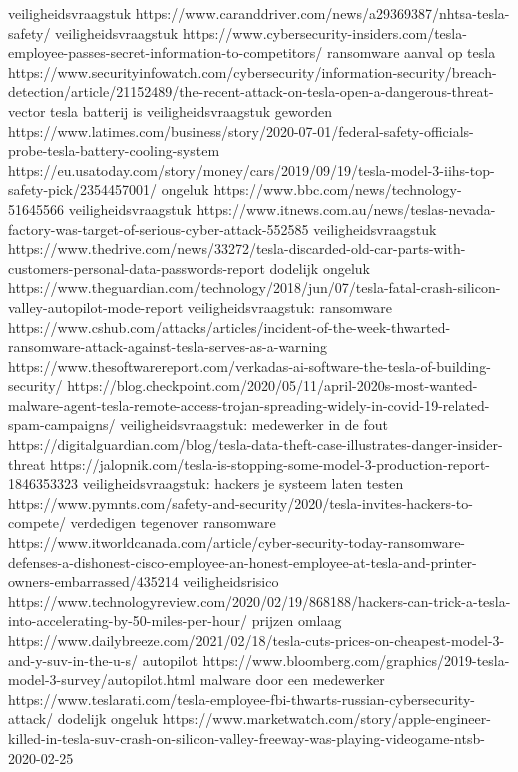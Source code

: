 veiligheidsvraagstuk
https://www.caranddriver.com/news/a29369387/nhtsa-tesla-safety/
veiligheidsvraagstuk
https://www.cybersecurity-insiders.com/tesla-employee-passes-secret-information-to-competitors/
ransomware aanval op tesla
https://www.securityinfowatch.com/cybersecurity/information-security/breach-detection/article/21152489/the-recent-attack-on-tesla-open-a-dangerous-threat-vector
tesla batterij is veiligheidsvraagstuk geworden
https://www.latimes.com/business/story/2020-07-01/federal-safety-officials-probe-tesla-battery-cooling-system
https://eu.usatoday.com/story/money/cars/2019/09/19/tesla-model-3-iihs-top-safety-pick/2354457001/
ongeluk
https://www.bbc.com/news/technology-51645566
veiligheidsvraagstuk
https://www.itnews.com.au/news/teslas-nevada-factory-was-target-of-serious-cyber-attack-552585
veiligheidsvraagstuk
https://www.thedrive.com/news/33272/tesla-discarded-old-car-parts-with-customers-personal-data-passwords-report
dodelijk ongeluk
https://www.theguardian.com/technology/2018/jun/07/tesla-fatal-crash-silicon-valley-autopilot-mode-report
veiligheidsvraagstuk: ransomware
https://www.cshub.com/attacks/articles/incident-of-the-week-thwarted-ransomware-attack-against-tesla-serves-as-a-warning
https://www.thesoftwarereport.com/verkadas-ai-software-the-tesla-of-building-security/
https://blog.checkpoint.com/2020/05/11/april-2020s-most-wanted-malware-agent-tesla-remote-access-trojan-spreading-widely-in-covid-19-related-spam-campaigns/
veiligheidsvraagstuk: medewerker in de fout
https://digitalguardian.com/blog/tesla-data-theft-case-illustrates-danger-insider-threat
https://jalopnik.com/tesla-is-stopping-some-model-3-production-report-1846353323
veiligheidsvraagstuk: hackers je systeem laten testen
https://www.pymnts.com/safety-and-security/2020/tesla-invites-hackers-to-compete/
verdedigen tegenover ransomware
https://www.itworldcanada.com/article/cyber-security-today-ransomware-defenses-a-dishonest-cisco-employee-an-honest-employee-at-tesla-and-printer-owners-embarrassed/435214
veiligheidsrisico
https://www.technologyreview.com/2020/02/19/868188/hackers-can-trick-a-tesla-into-accelerating-by-50-miles-per-hour/
prijzen omlaag
https://www.dailybreeze.com/2021/02/18/tesla-cuts-prices-on-cheapest-model-3-and-y-suv-in-the-u-s/
autopilot
https://www.bloomberg.com/graphics/2019-tesla-model-3-survey/autopilot.html
malware door een medewerker
https://www.teslarati.com/tesla-employee-fbi-thwarts-russian-cybersecurity-attack/
dodelijk ongeluk
https://www.marketwatch.com/story/apple-engineer-killed-in-tesla-suv-crash-on-silicon-valley-freeway-was-playing-videogame-ntsb-2020-02-25
